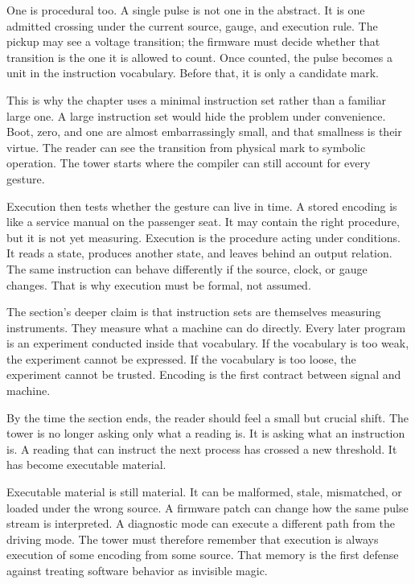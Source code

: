 One is procedural too. A single pulse is not one in the abstract. It is one
admitted crossing under the current source, gauge, and execution rule. The
pickup may see a voltage transition; the firmware must decide whether that
transition is the one it is allowed to count. Once counted, the pulse becomes a
unit in the instruction vocabulary. Before that, it is only a candidate mark.

This is why the chapter uses a minimal instruction set rather than a familiar
large one. A large instruction set would hide the problem under convenience.
Boot, zero, and one are almost embarrassingly small, and that smallness is
their virtue. The reader can see the transition from physical mark to symbolic
operation. The tower starts where the compiler can still account for every
gesture.

Execution then tests whether the gesture can live in time. A stored encoding
is like a service manual on the passenger seat. It may contain the right
procedure, but it is not yet measuring. Execution is the procedure acting under
conditions. It reads a state, produces another state, and leaves behind an
output relation. The same instruction can behave differently if the source,
clock, or gauge changes. That is why execution must be formal, not assumed.

The section's deeper claim is that instruction sets are themselves measuring
instruments. They measure what a machine can do directly. Every later program
is an experiment conducted inside that vocabulary. If the vocabulary is too
weak, the experiment cannot be expressed. If the vocabulary is too loose, the
experiment cannot be trusted. Encoding is the first contract between signal and
machine.

By the time the section ends, the reader should feel a small but crucial
shift. The tower is no longer asking only what a reading is. It is asking what
an instruction is. A reading that can instruct the next process has crossed a
new threshold. It has become executable material.

Executable material is still material. It can be malformed, stale, mismatched,
or loaded under the wrong source. A firmware patch can change how the same
pulse stream is interpreted. A diagnostic mode can execute a different path
from the driving mode. The tower must therefore remember that execution is
always execution of some encoding from some source. That memory is the first
defense against treating software behavior as invisible magic.

